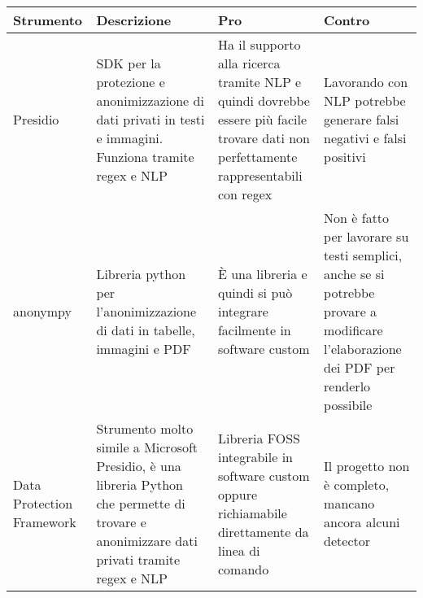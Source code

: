 \documentclass[12pt]{report}
\begin{document}
\begin{tabular}{|p{}|p{}|p{}|p{}|}
    \hline
    \textbf{Strumento}        & \textbf{Descrizione}                                                                                                                       & \textbf{Pro}                                                                                                                                                                                                  & \textbf{Contro}                                                                                                                                                                                                                                     \\ \hline
    Presidio                  & SDK per la protezione e anonimizzazione di dati privati in testi e immagini. Funziona tramite regex e NLP                                  & Ha il supporto alla ricerca tramite NLP e quindi dovrebbe essere più facile trovare dati non perfettamente rappresentabili con regex                                                                          & Lavorando con NLP potrebbe generare falsi negativi e falsi positivi                                                                                                                                                                                 \\ \hline
    anonympy                  & Libreria python per l'anonimizzazione di dati in tabelle, immagini e PDF                                                                   & È una libreria e quindi si può integrare facilmente in software custom                                                                                                                                        & Non è fatto per lavorare su testi semplici, anche se si potrebbe provare a modificare l'elaborazione dei PDF per renderlo possibile                                                                                                                 \\ \hline
    Data Protection Framework & Strumento molto simile a Microsoft Presidio, è una libreria Python che permette di trovare e anonimizzare dati privati tramite regex e NLP & Libreria FOSS integrabile in software custom oppure richiamabile direttamente da linea di comando                                                                                                             & Il progetto non è completo, mancano ancora alcuni detector                                                                                                                                                                                          \\ \hline

\end{tabular}
\end{document}
